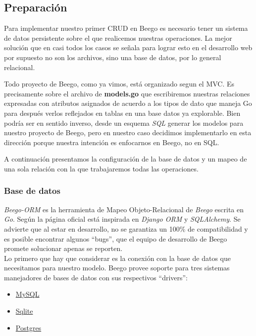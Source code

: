 \documentclass[12pt]{article}
\begin{document}
\subsection{Preparación}
Para implementar nuestro primer CRUD en Beego es necesario tener un sistema de
datos persistente sobre el
que realicemos nuestras operaciones.
La mejor solución que en casi todos los casos se señala para lograr esto en el desarrollo
web por supuesto no son los archivos, sino una base de datos, por lo general
relacional. \par
Todo proyecto de Beego, como ya vimos, está organizado segun el MVC. Es precisamente
sobre el archivo de \textbf{models.go} que escribiremos nuestras
relaciones expresadas con atributos asignados de acuerdo a los tipos de dato
que maneja Go para después verlos reflejados en tablas en una base datos ya explorable.
Bien podría ser en sentido inverso, desde un esquema \textit{SQL} generar los modelos
para nuestro proyecto de Beego, pero en nuestro caso decidimos implementarlo
en esta dirección porque nuestra intención es enfocarnos en Beego, no en SQL.\par
A continuación presentamos la configuración de la base de datos y un mapeo
de una sola relación con la que trabajaremos todas las operaciones.
\subsubsection*{Base de datos}
\textit{Beego-ORM} es la herramienta de Mapeo Objeto-Relacional de \textit{Beego}
escrita en \textit{Go}. Según la página oficial está inspirada en \textit{Django ORM}
y \textit{SQLAlchemy}. Se advierte que al estar en desarrollo, no se garantiza
un 100\% de compatibilidad y es posible encontrar algunos ``bugs'', que el
equipo de desarrollo de Beego promete solucionar apenas se reporten.\\

Lo primero que hay que considerar es la conexión con la base de datos que necesitamos para nuestro modelo.
Beego provee soporte para tres sistemas manejadores de bases de datos
con sus respectivos ``drivers'':
\begin{itemize}
\item \href{http://www.mysql.com/}{MySQL}
\item \href{https://sqlite.org/}{Sqlite}
\item \href{http://www.postgresql.org.es/}{Postgres}
\end{itemize}
\end{document}
